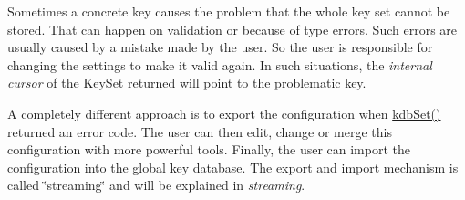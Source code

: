 Sometimes a concrete key causes the problem that the whole key set cannot be stored. That can happen on validation or because of type errors. Such errors are usually caused by a mistake made by the user. So the user is responsible for changing the settings to make it valid again. In such situations, the {\itshape internal cursor} of the {\ttfamily Key\+Set} {\ttfamily returned} will point to the problematic key.

A completely different approach is to export the configuration when {\ttfamily \hyperlink{group__kdb_ga11436b058408f83d303ca5e996832bcf}{kdb\+Set()}} returned an error code. The user can then edit, change or merge this configuration with more powerful tools. Finally, the user can import the configuration into the global key database. The export and import mechanism is called \char`\"{}streaming\char`\"{} and will be explained in {\itshape streaming}. 